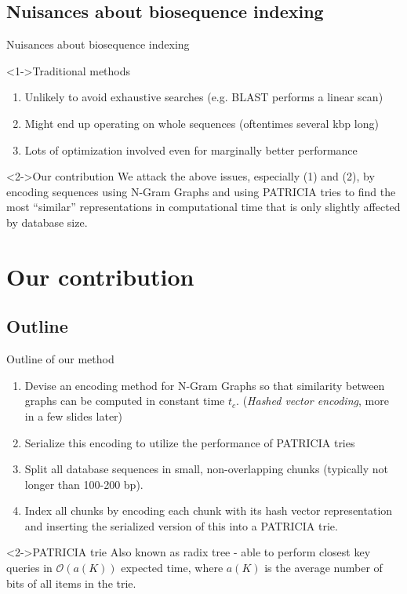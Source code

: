 \documentclass[9pt]{beamer}
\let\oldcite=\cite
\renewcommand\cite[1]{\hypersetup{linkcolor=magenta} \hyperlink{#1}{\oldcite{#1}}}
\begin{document}
\subsection{Nuisances about biosequence indexing}
\begin{frame}{Nuisances about biosequence indexing}
	\begin{block}<1->{Traditional methods}
		\begin{enumerate}
			\item Unlikely to avoid exhaustive searches (e.g. BLAST performs a linear scan)
			\item Might end up operating on whole sequences (oftentimes several kbp long)
			\item Lots of optimization involved even for marginally better performance
		\end{enumerate}
	\end{block}
	\begin{block}<2->{Our contribution}
		We attack the above issues, especially (1) and (2), by encoding sequences using N-Gram Graphs and using PATRICIA tries to find the most ``similar'' representations in computational time that is only slightly affected by database size.
	\end{block}
\end{frame}
	
\section{Our contribution}
\subsection{Outline}
\begin{frame}{Outline of our method}
	\begin{enumerate}
		\item<1-> Devise an encoding method for N-Gram Graphs so that similarity between graphs can be computed in constant time $t_c$. (\textit{Hashed vector encoding}, more in a few slides later)
		\item<2-> Serialize this encoding to utilize the performance of PATRICIA tries
		\item<3-> Split all database sequences in small, non-overlapping chunks (typically not longer than 100-200 bp).
		\item<4-> Index all chunks by encoding each chunk with its hash vector representation and inserting the serialized version of this into a PATRICIA trie.
	\end{enumerate}
	\begin{block}<2->{PATRICIA trie}
		Also known as radix tree - able to perform closest key queries in $\mathcal{O}(a(K))$ expected time, where $a(K)$ is the average number of bits of all items in the trie.\cite{morrison1968patricia}
	\end{block}
\end{frame}
\end{document}
